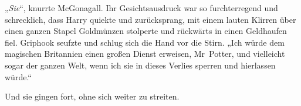 „\emph{Sie}“, knurrte McGonagall. Ihr Gesichtsausdruck war so furchterregend und schrecklich, dass Harry quiekte und zurücksprang, mit einem lauten Klirren über einen ganzen Stapel Goldmünzen stolperte und rückwärts in einen Geldhaufen fiel. Griphook seufzte und schlug sich die Hand vor die Stirn.
„Ich würde dem magischen Britannien einen großen Dienst erweisen, Mr~Potter, und vielleicht sogar der ganzen Welt, wenn ich sie in dieses Verlies sperren und hierlassen würde.“

Und sie gingen fort, ohne sich weiter zu streiten.


